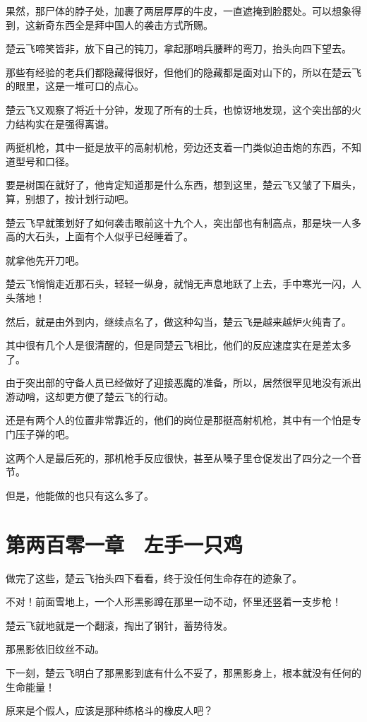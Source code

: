 果然，那尸体的脖子处，加裹了两层厚厚的牛皮，一直遮掩到脸腮处。可以想象得到，这新奇东西全是拜中国人的袭击方式所赐。

楚云飞啼笑皆非，放下自己的钝刀，拿起那哨兵腰畔的弯刀，抬头向四下望去。

那些有经验的老兵们都隐藏得很好，但他们的隐藏都是面对山下的，所以在楚云飞的眼里，这是一堆可口的点心。

楚云飞又观察了将近十分钟，发现了所有的士兵，也惊讶地发现，这个突出部的火力结构实在是强得离谱。

两挺机枪，其中一挺是放平的高射机枪，旁边还支着一门类似迫击炮的东西，不知道型号和口径。

要是树国在就好了，他肯定知道那是什么东西，想到这里，楚云飞又皱了下眉头，算，别想了，按计划行动吧。

楚云飞早就策划好了如何袭击眼前这十九个人，突出部也有制高点，那是块一人多高的大石头，上面有个人似乎已经睡着了。

就拿他先开刀吧。

楚云飞悄悄走近那石头，轻轻一纵身，就悄无声息地跃了上去，手中寒光一闪，人头落地！

然后，就是由外到内，继续点名了，做这种勾当，楚云飞是越来越炉火纯青了。

其中很有几个人是很清醒的，但是同楚云飞相比，他们的反应速度实在是差太多了。

由于突出部的守备人员已经做好了迎接恶魔的准备，所以，居然很罕见地没有派出游动哨，这却更方便了楚云飞的行动。

还是有两个人的位置非常靠近的，他们的岗位是那挺高射机枪，其中有一个怕是专门压子弹的吧。

这两个人是最后死的，那机枪手反应很快，甚至从嗓子里仓促发出了四分之一个音节。

但是，他能做的也只有这么多了。

\section{第两百零一章　左手一只鸡}

做完了这些，楚云飞抬头四下看看，终于没任何生命存在的迹象了。

不对！前面雪地上，一个人形黑影蹲在那里一动不动，怀里还竖着一支步枪！

楚云飞就地就是一个翻滚，掏出了钢针，蓄势待发。

那黑影依旧纹丝不动。

下一刻，楚云飞明白了那黑影到底有什么不妥了，那黑影身上，根本就没有任何的生命能量！

原来是个假人，应该是那种练格斗的橡皮人吧？

